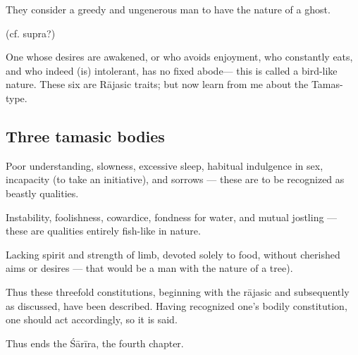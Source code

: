 \begin{translation}
\begin{tt}
They consider a greedy and  ungenerous man to have the nature of a ghost.

\item[91]  (cf. supra?)

One whose desires are awakened, or who avoids enjoyment,
who constantly eats, and who indeed (is) intolerant, has no fixed abode— this is called a bird-like nature. These six are Rājasic traits; but now learn from me about the Tamas-type.

\subsection{Three tamasic bodies}

\item[95]

Poor understanding, slowness, excessive sleep, habitual indulgence in sex, incapacity (to take an initiative), and sorrows — these are to be recognized as beastly qualities.

\item[96]

Instability, foolishness, cowardice, fondness for water, and mutual jostling — these are qualities entirely fish-like in nature.

\item[97]

Lacking spirit and strength of limb, devoted solely to food, without cherished aims or desires  — that would be a man with the nature of a tree).

\item[98]

Thus these threefold constitutions, beginning with the rājasic and subsequently as discussed, have been described. Having recognized one’s bodily constitution, one should act accordingly, so it is said. 

\item[99]

Thus ends the Śārīra, the fourth chapter.

\end{tt}
\end{translation}